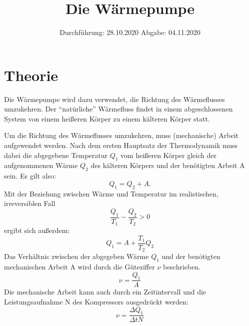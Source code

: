 

\subject{D206}
\title{Die Wärmepumpe}
\date{
    Durchführung: 28.10.2020
    \hspace{3em}
    Abgabe: 04.11.2020
}



\maketitle
\thispagestyle{empty}
\tableofcontents
\newpage

\section{Theorie} \label{sec:Theorie}

    Die Wärmepumpe wird dazu verwendet, die Richtung des Wärmeflusses umzukehren.
    Der \enquote{natürliche} Wärmefluss findet in einem abgeschlossenen System von einem heißeren Körper
    zu einem kälteren Körper statt.

    Um die Richtung des Wärmeflusses umzukehren, muss (mechanische) Arbeit aufgewendet werden.
    Nach dem ersten Hauptsatz der Thermodynamik muss dabei die abgegebene Temperatur $Q_1$ vom heißeren Körper
    gleich der aufgenommenen Wärme $Q_2$ des kälteren Körpers und der benötigten Arbeit A sein.
    Es gilt also:
    \begin{equation}
        Q_1 = Q_2 + A .
    \end{equation}
    Mit der Beziehung zwischen Wärme und Temperatur im realistischen, irreversiblen Fall
    \begin{equation}
        \frac{Q_1}{T_1} - \frac{Q_2}{T_2} > 0
    \end{equation}
    ergibt sich außerdem:
    \begin{equation}
        Q_1 = A + \frac{T_1}{T_2} Q_2
    \end{equation}
    Das Verhältnis zwischen der abgegeben Wärme $Q_1$ und der benötigten mechanischen Arbeit A wird durch die Güteziffer $\nu$
    beschrieben.
    \begin{equation}
        \nu = \frac{Q_1}{A}
    \end{equation}
    Die mechanische Arbeit kann auch durch ein Zeitintervall und die Leistungsaufnahme N des Kompressors ausgedrückt werden:
    \begin{equation}
        \nu = \frac{\Delta Q_1}{\Delta t N}
    \end{equation}

